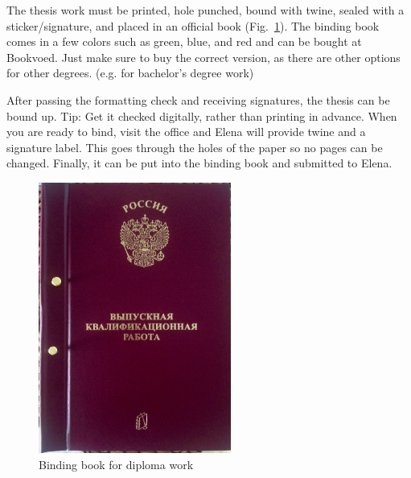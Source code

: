 \label{sec:guidelines_content}
The thesis work must be printed, hole punched, bound with twine, sealed with a sticker/signature, and placed in an official book (Fig.~\ref{fig:binding}). The binding book comes in a few colors such as green, blue, and red and can be bought at Bookvoed. Just make sure to buy the correct version, as there are other options for other degrees. (e.g. for bachelor's degree work)

After passing the formatting check and receiving signatures, the thesis can be bound up. Tip: Get it checked digitally, rather than printing in advance. When you are ready to bind, visit the office and Elena will provide twine and a signature label. This goes through the holes of the paper so no pages can be changed. Finally, it can be put into the binding book and submitted to Elena.

\begin{figure}[H]
    \centering
    \includegraphics[height=3.5in]{figures/binding.jpeg}
    \vspace*{-4mm}
    \caption{Binding book for diploma work}
    \label{fig:binding}
\end{figure}
